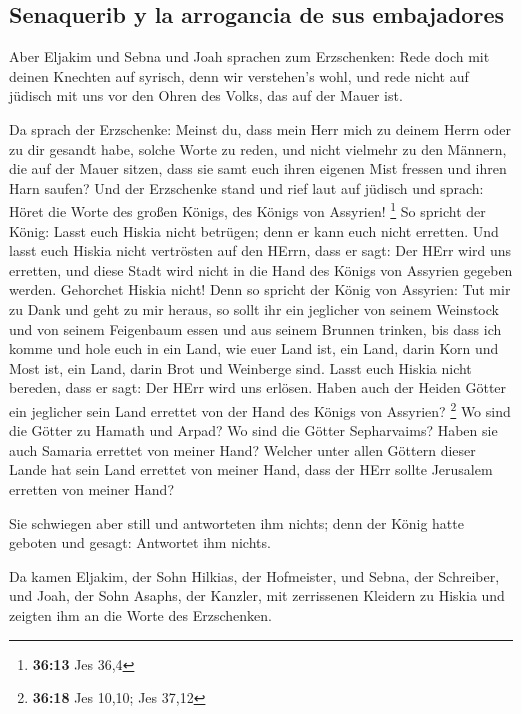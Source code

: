 \hypertarget{senaquerib-y-la-arrogancia-de-sus-embajadores}{%
\subsection{Senaquerib y la arrogancia de sus
embajadores}\label{senaquerib-y-la-arrogancia-de-sus-embajadores}}

 Aber Eljakim und Sebna und Joah sprachen zum
Erzschenken: Rede doch mit deinen Knechten auf syrisch, denn wir
verstehen's wohl, und rede nicht auf jüdisch mit uns vor den Ohren des
Volks, das auf der Mauer ist.

 Da sprach der Erzschenke: Meinst du, dass mein Herr mich
zu deinem Herrn oder zu dir gesandt habe, solche Worte zu reden, und
nicht vielmehr zu den Männern, die auf der Mauer sitzen, dass sie samt
euch ihren eigenen Mist fressen und ihren Harn saufen? 
Und der Erzschenke stand und rief laut auf jüdisch und sprach: Höret die
Worte des großen Königs, des Königs von Assyrien! \footnote{\textbf{36:13}
  Jes 36,4}  So spricht der König: Lasst euch Hiskia
nicht betrügen; denn er kann euch nicht erretten.  Und
lasst euch Hiskia nicht vertrösten auf den HErrn, dass er sagt: Der HErr
wird uns erretten, und diese Stadt wird nicht in die Hand des Königs von
Assyrien gegeben werden.  Gehorchet Hiskia nicht! Denn so
spricht der König von Assyrien: Tut mir zu Dank und geht zu mir heraus,
so sollt ihr ein jeglicher von seinem Weinstock und von seinem
Feigenbaum essen und aus seinem Brunnen trinken,  bis
dass ich komme und hole euch in ein Land, wie euer Land ist, ein Land,
darin Korn und Most ist, ein Land, darin Brot und Weinberge sind.
 Lasst euch Hiskia nicht bereden, dass er sagt: Der HErr
wird uns erlösen. Haben auch der Heiden Götter ein jeglicher sein Land
errettet von der Hand des Königs von Assyrien? \footnote{\textbf{36:18}
  Jes 10,10; Jes 37,12}  Wo sind die Götter zu Hamath und
Arpad? Wo sind die Götter Sepharvaims? Haben sie auch Samaria errettet
von meiner Hand?  Welcher unter allen Göttern dieser
Lande hat sein Land errettet von meiner Hand, dass der HErr sollte
Jerusalem erretten von meiner Hand?

 Sie schwiegen aber still und antworteten ihm nichts;
denn der König hatte geboten und gesagt: Antwortet ihm nichts.

 Da kamen Eljakim, der Sohn Hilkias, der Hofmeister, und
Sebna, der Schreiber, und Joah, der Sohn Asaphs, der Kanzler, mit
zerrissenen Kleidern zu Hiskia und zeigten ihm an die Worte des
Erzschenken.

